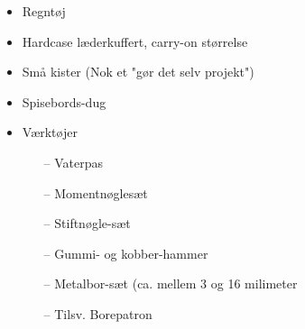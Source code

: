 
\begin{itemize}
\subsection{Praktiske Ting}
    \item Regntøj
    \item Hardcase læderkuffert, carry-on størrelse
    \item Små kister (Nok et "gør det selv projekt")
    \item Spisebords-dug
    \item Værktøjer
         \begin{itemize}
            \item[--]   Vaterpas
            \item[--]   Momentnøglesæt
            \item[--]   Stiftnøgle-sæt
            \item[--]   Gummi- og kobber-hammer
            \item[--]   Metalbor-sæt (ca. mellem 3 og 16 milimeter
            \item[--]   Tilsv. Borepatron
        \end{itemize}
\end{itemize}